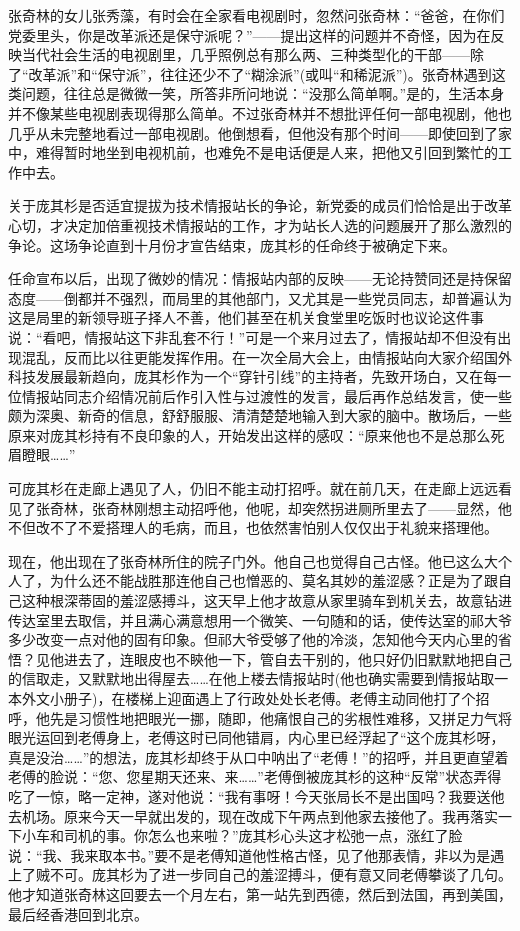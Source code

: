 \par 张奇林的女儿张秀藻，有时会在全家看电视剧时，忽然问张奇林：“爸爸，在你们党委里头，你是改革派还是保守派呢？”——提出这样的问题并不奇怪，因为在反映当代社会生活的电视剧里，几乎照例总有那么两、三种类型化的干部——除了“改革派”和“保守派”，往往还少不了“糊涂派”(或叫“和稀泥派”)。张奇林遇到这类问题，往往总是微微一笑，所答非所问地说：“没那么简单啊。”是的，生活本身并不像某些电视剧表现得那么简单。不过张奇林并不想批评任何一部电视剧，他也几乎从未完整地看过一部电视剧。他倒想看，但他没有那个时间——即使回到了家中，难得暂时地坐到电视机前，也难免不是电话便是人来，把他又引回到繁忙的工作中去。
\par 关于庞其杉是否适宜提拔为技术情报站长的争论，新党委的成员们恰恰是出于改革心切，才决定加倍重视技术情报站的工作，才为站长人选的问题展开了那么激烈的争论。这场争论直到十月份才宣告结束，庞其杉的任命终于被确定下来。
\par 任命宣布以后，出现了微妙的情况：情报站内部的反映——无论持赞同还是持保留态度——倒都并不强烈，而局里的其他部门，又尤其是一些党员同志，却普遍认为这是局里的新领导班子择人不善，他们甚至在机关食堂里吃饭时也议论这件事说：“看吧，情报站这下非乱套不行！”可是一个来月过去了，情报站却不但没有出现混乱，反而比以往更能发挥作用。在一次全局大会上，由情报站向大家介绍国外科技发展最新趋向，庞其杉作为一个“穿针引线”的主持者，先致开场白，又在每一位情报站同志介绍情况前后作引入性与过渡性的发言，最后再作总结发言，使一些颇为深奥、新奇的信息，舒舒服服、清清楚楚地输入到大家的脑中。散场后，一些原来对庞其杉持有不良印象的人，开始发出这样的感叹：“原来他也不是总那么死眉瞪眼……”
\par 可庞其杉在走廊上遇见了人，仍旧不能主动打招呼。就在前几天，在走廊上远远看见了张奇林，张奇林刚想主动招呼他，他呢，却突然拐进厕所里去了——显然，他不但改不了不爱搭理人的毛病，而且，也依然害怕别人仅仅出于礼貌来搭理他。
\par 现在，他出现在了张奇林所住的院子门外。他自己也觉得自己古怪。他已这么大个人了，为什么还不能战胜那连他自己也憎恶的、莫名其妙的羞涩感？正是为了跟自己这种根深蒂固的羞涩感搏斗，这天早上他才故意从家里骑车到机关去，故意钻进传达室里去取信，并且满心满意想用一个微笑、一句随和的话，使传达室的祁大爷多少改变一点对他的固有印象。但祁大爷受够了他的冷淡，怎知他今天内心里的省悟？见他进去了，连眼皮也不鿃他一下，管自去干别的，他只好仍旧默默地把自己的信取走，又默默地出得屋去……在他上楼去情报站时(他也确实需要到情报站取一本外文小册子)，在楼梯上迎面遇上了行政处处长老傅。老傅主动同他打了个招呼，他先是习惯性地把眼光一挪，随即，他痛恨自己的劣根性难移，又拼足力气将眼光运回到老傅身上，老傅这时已同他错肩，内心里已经浮起了“这个庞其杉呀，真是没治……”的想法，庞其杉却终于从口中呐出了“老傅！”的招呼，并且更直望着老傅的脸说：“您、您星期天还来、来……”老傅倒被庞其杉的这种“反常”状态弄得吃了一惊，略一定神，遂对他说：“我有事呀！今天张局长不是出国吗？我要送他去机场。原来今天一早就出发的，现在改成下午两点到他家去接他了。我再落实一下小车和司机的事。你怎么也来啦？”庞其杉心头这才松弛一点，涨红了脸说：“我、我来取本书。”要不是老傅知道他性格古怪，见了他那表情，非以为是遇上了贼不可。庞其杉为了进一步同自己的羞涩搏斗，便有意又同老傅攀谈了几句。他才知道张奇林这回要去一个月左右，第一站先到西德，然后到法国，再到美国，最后经香港回到北京。
